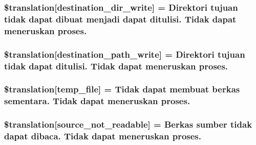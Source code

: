 \subsubsection[{\$translation}]{\setlength{\rightskip}{0pt plus 5cm}\$translation\mbox{[}\textquotesingle{}destination\+\_\+dir\+\_\+write\textquotesingle{}\mbox{]} = \textquotesingle{}Direktori tujuan tidak dapat dibuat menjadi dapat ditulisi. Tidak dapat meneruskan proses.\textquotesingle{}}\label{class_8upload_8id___i_d_8php_a97608ea194a616db49141a0e6dee900c}
\hypertarget{class_8upload_8id___i_d_8php_a40e4e1962226b89fd76da5819a9602b0}{}
\subsubsection[{\$translation}]{\setlength{\rightskip}{0pt plus 5cm}\$translation\mbox{[}\textquotesingle{}destination\+\_\+path\+\_\+write\textquotesingle{}\mbox{]} = \textquotesingle{}Direktori tujuan tidak dapat ditulisi. Tidak dapat meneruskan proses.\textquotesingle{}}\label{class_8upload_8id___i_d_8php_a40e4e1962226b89fd76da5819a9602b0}
\hypertarget{class_8upload_8id___i_d_8php_a2baece8da11e20d45175db91851ec3e3}{}
\subsubsection[{\$translation}]{\setlength{\rightskip}{0pt plus 5cm}\$translation\mbox{[}\textquotesingle{}temp\+\_\+file\textquotesingle{}\mbox{]} = \textquotesingle{}Tidak dapat membuat berkas sementara. Tidak dapat meneruskan proses.\textquotesingle{}}\label{class_8upload_8id___i_d_8php_a2baece8da11e20d45175db91851ec3e3}
\hypertarget{class_8upload_8id___i_d_8php_a922967ca2df0efdd455261142d8e5715}{}
\subsubsection[{\$translation}]{\setlength{\rightskip}{0pt plus 5cm}\$translation\mbox{[}\textquotesingle{}source\+\_\+not\+\_\+readable\textquotesingle{}\mbox{]} = \textquotesingle{}Berkas sumber tidak dapat dibaca. Tidak dapat meneruskan proses.\textquotesingle{}}\label{class_8upload_8id___i_d_8php_a922967ca2df0efdd455261142d8e5715}
\hypertarget{class_8upload_8id___i_d_8php_a346dfd1ade29f583dd20d345c436859f}{}
